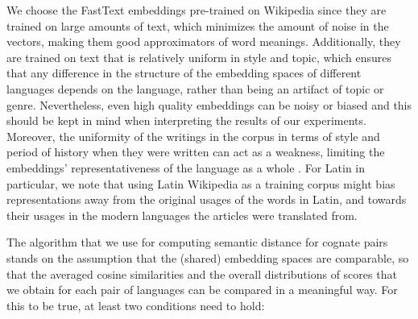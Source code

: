 \documentclass[output=paper]{langsci/langscibook}
\begin{document}
We choose the FastText \citep{bojanowski2017enriching} embeddings pre-trained on Wikipedia since they are trained on large amounts of text, which minimizes the amount of noise in the vectors, making them good approximators of word meanings. Additionally, they are trained on text that is relatively uniform in style and topic, which ensures that any difference in the structure of the embedding spaces of different languages depends on the language, rather than being an artifact of topic or genre. Nevertheless, even high quality embeddings can be noisy or biased and this should be kept in mind when interpreting the results of our experiments. Moreover, the uniformity of the writings in the corpus in terms of style and period of history when they were written can act as a weakness, limiting the embeddings' representativeness of the language as a whole \citep{koplenig2016}. For Latin in particular, we note that using Latin Wikipedia as a training corpus might bias representations away from the original usages of the words in Latin, and towards their usages in the modern languages the articles were translated from.

The algorithm that we use for computing semantic distance for cognate pairs stands on the assumption that the (shared) embedding spaces are comparable, so that the averaged cosine similarities and the overall distributions of scores that we obtain for each pair of languages can be compared in a meaningful way. For this to be true, at least two conditions need to hold:
\end{document}
